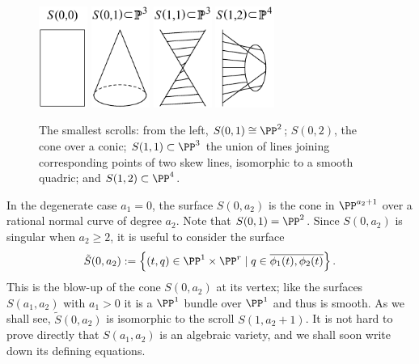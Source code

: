 \begin{figure}
\includegraphics[height=1.3in]{"main/Fig16-1A"}\qquad
\includegraphics[height=1.3in]{"main/Fig16-1B"}\qquad
\includegraphics[height=1.3in]{"main/Fig16-1C"}\qquad
\includegraphics[height=1.3in]{"main/Fig16-1D"}%

\caption{The smallest scrolls: from the left, $S(0,1) \cong \PP^{2}$;
$S(0,2)$, the cone over a conic; $S(1,1)\subset \PP^{3}$ the union of
lines joining corresponding points of two skew lines, isomorphic to a
smooth quadric; and $S(1,2)\subset \PP^{4}$.
}
\label{Fig16.1}
\end{figure}


In the degenerate case $a_{1}= 0$, the surface $S(0,a_{2})$ is the cone
in $\PP^{a_{2}+1}$ over a rational normal curve of degree $a_{2}$. Note that $S(0,1) = \PP^{2}$. Since $S(0,a_2)$ is singular when $a_2\geq 2$, it is useful to consider the surface
$$
\tilde S(0, a_2) := \left\{ (t, q) \in \PP^1 \times \PP^r  \mid q \in \overline{\phi_1(t), \phi_2(t)}\right\}.
$$
This is the blow-up of the cone $S(0, a_2)$ at its vertex; like the surfaces $S(a_1,a_2)$ with $a_1 > 0$ it is a $\PP^1$ bundle over $\PP^1$ and thus is smooth. As we shall see, $\tilde S(0, a_2)$ is isomorphic to the scroll $S(1, a_2+1)$.
It is not hard to prove directly that $S(a_1,a_2)$ is an algebraic variety, and we shall soon write down its defining equations.


